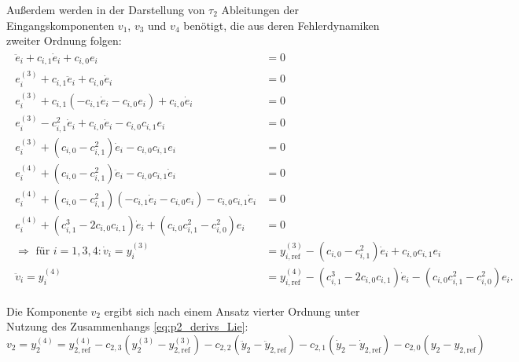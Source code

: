 Außerdem werden in der Darstellung von $\tau_2$ Ableitungen der Eingangskomponenten $v_1$, $v_3$ und $v_4$ benötigt, die aus deren Fehlerdynamiken zweiter Ordnung folgen:
\begin{align}
	\begin{split}
	    \ddot{e}_i + c_{i,1} \dot{e}_i + c_{i, 0} e_i &= 0 \\
		e_i^{(3)} + c_{i, 1} \ddot{e}_i + c_{i, 0} \dot{e}_i &= 0 \\
		e_i^{(3)} + c_{i, 1} (-c_{i, 1} \dot{e}_i - c_{i, 0} e_i) + c_{i, 0} \dot{e}_i &= 0 \\
		e_i^{(3)} - c_{i, 1}^2 \dot{e}_i + c_{i, 0} \dot{e}_i - c_{i, 0} c_{i, 1} e_i &= 0 \\
		e_i^{(3)} + (c_{i, 0} - c_{i, 1}^2) \dot{e}_i - c_{i, 0} c_{i, 1} e_i &= 0 \\
		e_i^{(4)} + (c_{i, 0} - c_{i, 1}^2) \ddot{e}_i - c_{i, 0} c_{i, 1} \dot{e}_i &= 0 \\
		e_i^{(4)} + (c_{i, 0} - c_{i, 1}^2) (-c_{i, 1} \dot{e}_i - c_{i, 0} e_i) - c_{i, 0} c_{i, 1} \dot{e}_i &= 0 \\
		e_i^{(4)} + (c_{i, 1}^3 - 2 c_{i, 0} c_{i, 1}) \dot{e}_i + (c_{i, 0} c_{i, 1}^2 - c_{i, 0}^2) e_i &= 0 \\
		\Rightarrow \text{ für } i = 1,3,4: \dot{v}_i = y_i^{(3)} &= y_{i, \text{ref}}^{(3)} - (c_{i, 0} - c_{i, 1}^2) \dot{e}_i + c_{i, 0} c_{i, 1} e_i \\
		\ddot{v}_i = y_i^{(4)} &= y_{i, \text{ref}}^{(4)} - (c_{i, 1}^3 - 2 c_{i, 0} c_{i, 1}) \dot{e}_i - (c_{i, 0} c_{i, 1}^2 - c_{i, 0}^2) e_i.
	\end{split}
\end{align}

Die Komponente $v_2$ ergibt sich nach einem Ansatz vierter Ordnung unter Nutzung des Zusammenhangs \eqref{eq:p2_derivs_Lie}:
\begin{equation}
	v_2 = y_2^{(4)} = y_{2, \text{ref}}^{(4)} - c_{2, 3} (y_2^{(3)} - y_{2, \text{ref}}^{(3)}) - c_{2, 2} (\ddot{y}_2 - \ddot{y}_{2, \text{ref}}) - c_{2, 1} (\dot{y}_2 - \dot{y}_{2, \text{ref}}) - c_{2, 0} (y_2 - y_{2, \text{ref}})
\end{equation} 

